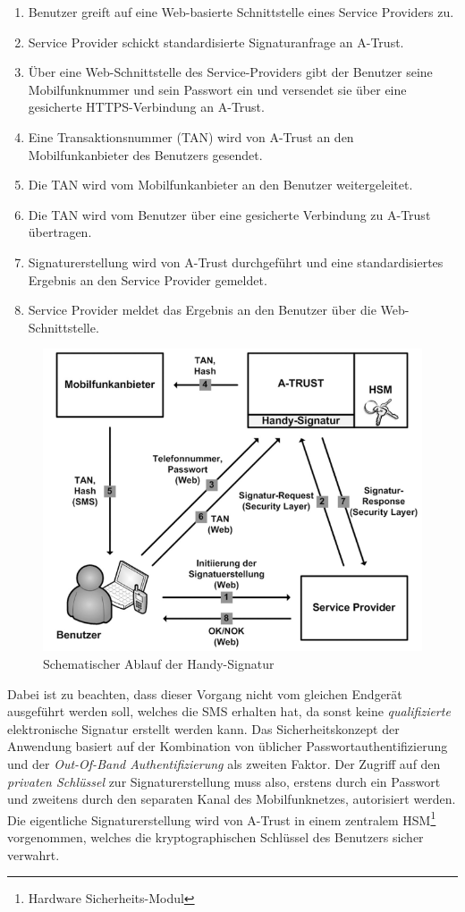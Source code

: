 \documentclass[11pt,a4paper,ngerman]{report}
\begin{document}
\begin{enumerate}
    \item Benutzer greift auf eine Web-basierte Schnittstelle eines Service Providers zu.
    \item Service Provider schickt standardisierte Signaturanfrage an A-Trust.
    \item Über eine Web-Schnittstelle des Service-Providers gibt der Benutzer seine Mobilfunknummer und sein Passwort ein und versendet sie über eine gesicherte HTTPS-Verbindung an A-Trust.
    \item Eine Transaktionsnummer (TAN) wird von A-Trust an den Mobilfunkanbieter des Benutzers gesendet.
    \item Die TAN wird vom Mobilfunkanbieter an den Benutzer weitergeleitet.
    \item Die TAN wird vom Benutzer über eine gesicherte Verbindung zu A-Trust übertragen.
    \item Signaturerstellung wird von A-Trust durchgeführt und eine standardisiertes Ergebnis an den Service Provider gemeldet.
    \item Service Provider meldet das Ergebnis an den Benutzer über die Web-Schnittstelle.
\end{enumerate}
\begin{figure}[htbp]
    \centering
        \includegraphics[width=\textwidth]{Abbildungen/Ablauf_Handy-Signatur.png}
    \caption{Schematischer Ablauf der Handy-Signatur}
    \label{fig:HandySignaturablauf}
\end{figure}
Dabei ist zu beachten, dass dieser Vorgang nicht vom gleichen Endgerät ausgeführt werden soll, welches die SMS erhalten hat, da sonst keine \textit{qualifizierte} elektronische Signatur erstellt werden kann. Das Sicherheitskonzept der Anwendung basiert auf der Kombination von üblicher Passwortauthentifizierung und der \textit{Out-Of-Band Authentifizierung} als zweiten Faktor. Der Zugriff auf den \textit{privaten Schlüssel} zur Signaturerstellung muss also, erstens durch ein Passwort und zweitens durch den separaten Kanal des Mobilfunknetzes, autorisiert werden. Die eigentliche Signaturerstellung wird von A-Trust in einem zentralem HSM\footnote{Hardware Sicherheits-Modul} vorgenommen, welches die kryptographischen Schlüssel des Benutzers sicher verwahrt.
\end{document}
